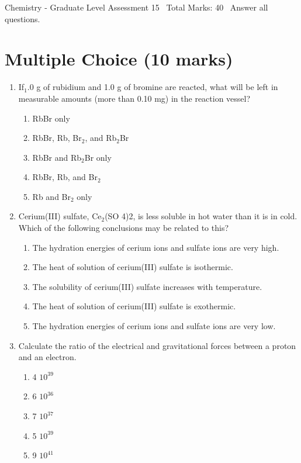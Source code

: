 \documentclass[12pt]{article}
\begin{document}
\begin{center}
Chemistry - Graduate Level Assessment 15 \
Total Marks: 40 \
Answer all questions.
\end{center}

\section*{Multiple Choice (10 marks)}
\begin{enumerate}[label=\arabic*.]
\item If$_{1}$.0 g of rubidium and 1.0 g of bromine are reacted, what will be left in measurable amounts (more than 0.10 mg) in the reaction vessel?
\begin{enumerate}[label=(\alph*)]
    \item RbBr only
    \item RbBr, Rb, Br$_{2}$, and Rb$_{2}$Br
    \item RbBr and Rb$_{2}$Br only
    \item RbBr, Rb, and Br$_{2}$
    \item Rb and Br$_{2}$ only
\end{enumerate}
\item Cerium(III) sulfate, Ce$_{2}$(SO 4)2, is less soluble in hot water than it is in cold. Which of the following conclusions may be related to this?
\begin{enumerate}[label=(\alph*)]
    \item The hydration energies of cerium ions and sulfate ions are very high.
    \item The heat of solution of cerium(III) sulfate is isothermic.
    \item The solubility of cerium(III) sulfate increases with temperature.
    \item The heat of solution of cerium(III) sulfate is exothermic.
    \item The hydration energies of cerium ions and sulfate ions are very low.
\end{enumerate}
\item Calculate the ratio of the electrical and gravitational forces between a proton and an electron.
\begin{enumerate}[label=(\alph*)]
    \item 4 $10^{39}$
    \item 6 $10^{36}$
    \item 7 $10^{37}$
    \item 5 $10^{39}$
    \item 9 $10^{41}$

\end{enumerate}
\end{enumerate}
\end{document}

